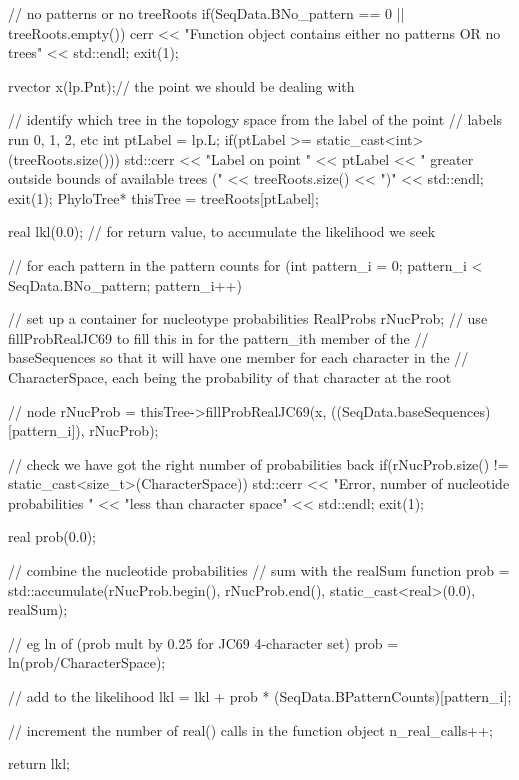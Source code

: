 \begin{DoxyCode}
{
                    // no patterns or no treeRoots
  if(SeqData.BNo_pattern == 0 || treeRoots.empty())
  {
    cerr << "Function object contains either no patterns OR no trees" 
         << std::endl;
    exit(1);
  }

  rvector x(lp.Pnt);// the point we should be dealing with

  // identify which tree in the topology space from the label of the point
                    // labels run 0, 1, 2, etc
  int ptLabel = lp.L;
  if(ptLabel >= static_cast<int>(treeRoots.size()))
  {
    std::cerr << "Label on point " << ptLabel <<
      " greater outside bounds of available trees ("
      << treeRoots.size() << ")" << std::endl;
    exit(1);
  }
  PhyloTree* thisTree = treeRoots[ptLabel];

  real lkl(0.0);    // for return value, to accumulate the likelihood we seek

  // for each pattern in the pattern counts
  for (int pattern_i = 0; pattern_i < SeqData.BNo_pattern; pattern_i++)
  {

                    // set up a container for nucleotype probabilities
    RealProbs rNucProb;
    // use fillProbRealJC69 to fill this in for the pattern_ith member of the 
    // baseSequences so that it will have one member for each character in the 
    // CharacterSpace, each being the probability of that character at the root
       
    // node
    rNucProb = 
      thisTree->fillProbRealJC69(x, ((SeqData.baseSequences)[pattern_i]), 
                                 rNucProb);

    // check we have got the right number of probabilities back
    if(rNucProb.size() != static_cast<size_t>(CharacterSpace))
    {
      std::cerr << "Error, number of nucleotide probabilities "
                << "less than character space" << std::endl;
      exit(1);
    }

    real prob(0.0);

    // combine the nucleotide probabilities
                    // sum with the realSum function
    prob = std::accumulate(rNucProb.begin(), rNucProb.end(), 
                           static_cast<real>(0.0), realSum);

    // eg ln of (prob mult by 0.25 for JC69 4-character set)
    prob = ln(prob/CharacterSpace);

    // add to the likelihood
    lkl = lkl + prob * (SeqData.BPatternCounts)[pattern_i];
  }

  // increment the number of real() calls in the function object
  n_real_calls++;   

  return lkl;
}
\end{DoxyCode}
